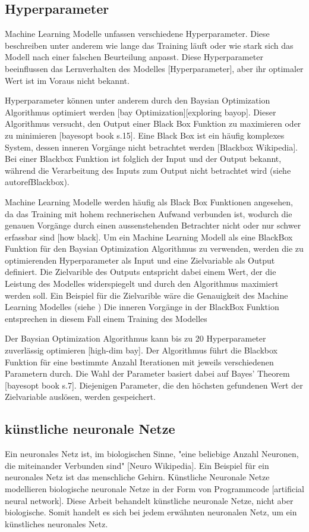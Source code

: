 \subsection{Hyperparameter}\label{sub:t_ml_hyper}
Machine Learning Modelle unfassen verschiedene Hyperparameter. Diese beschreiben
unter anderem wie lange das Training läuft oder wie stark sich das Modell nach
einer falschen Beurteilung anpasst. Diese Hyperparameter beeinflussen das
Lernverhalten des Modelles [Hyperparameter], aber ihr optimaler Wert ist im
Voraus nicht bekannt. 

Hyperparameter können unter anderem durch den Baysian Optimization Algorithmus
optimiert werden [bay Optimization][exploring bayop]. Dieser Algorithmus
versucht, den Output einer Black Box Funktion zu maximieren oder zu minimieren
[bayesopt book s.15]. Eine Black Box ist ein häufig komplexes System, dessen inneren
Vorgänge nicht betrachtet werden [Blackbox Wikipedia]. Bei einer Blackbox
Funktion ist folglich der Input und der Output bekannt, während die Verarbeitung
des Inputs zum Output nicht betrachtet wird (siehe autoref{Blackbox}).


Machine Learning Modelle werden häufig als Black Box Funktionen angesehen, da
das Training mit hohem rechnerischen Aufwand verbunden ist, wodurch die genauen
Vorgänge durch einen aussenstehenden Betrachter nicht oder nur schwer erfassbar
sind [how black]. Um ein Machine Learning Modell als eine BlackBox Funktion für
den Baysian Optimization Algorithmus zu verwenden, werden die zu optimierenden
Hyperparameter als Input und eine Zielvariable als Output definiert. Die
Zielvarible des Outputs entspricht dabei einem Wert, der die Leistung des
Modelles widerspiegelt und durch den Algorithmus maximiert werden soll. Ein
Beispiel für die Zielvarible wäre die Genauigkeit des Machine Learning Modelles
(siehe ) Die inneren Vorgänge in der BlackBox Funktion
entsprechen in diesem Fall einem Training des Modelles

Der Baysian Optimization Algorithmus kann bis zu 20 Hyperparameter zuverlässig
optimieren [high-dim bay]. Der Algorithmus führt die Blackbox Funktion für eine
bestimmte Anzahl Iterationen mit jeweils verschiedenen Parametern durch. Die
Wahl der Parameter basiert dabei auf Bayes' Theorem [bayesopt book s.7].
Diejenigen Parameter, die den höchsten gefundenen Wert der Zielvariable
auslösen, werden gespeichert.


\subsection{künstliche neuronale Netze}\label{sub:t_ml_nn}
Ein neuronales Netz ist, im biologischen Sinne, "eine beliebige Anzahl Neuronen,
die miteinander Verbunden sind" [Neuro Wikipedia]. Ein Beispiel für ein
neuronales Netz ist das menschliche Gehirn. Künstliche Neuronale Netze
modellieren biologische neuronale Netze in der Form von Programmcode [artificial
neural network]. Diese Arbeit behandelt künstliche neuronale Netze, nicht aber
biologische. Somit handelt es sich bei jedem erwähnten neuronalen Netz, um ein
künstliches neuronales Netz.

